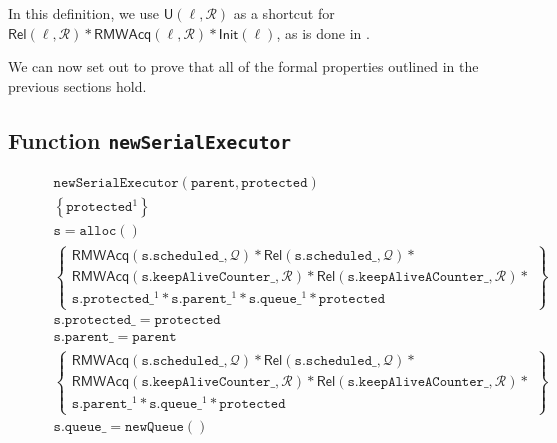 In this definition, we use $\mathsf{U}(\ell, \mathcal{R})$ as a shortcut for $\mathsf{Rel}(\ell, \mathcal{R}) * \mathsf{RMWAcq}(\ell, \mathcal{R}) * \mathsf{Init}(\ell)$, as is done in \cite{fsl}.

We can now set out to prove that all of the formal properties outlined in the previous sections hold.

\subsection{Function \texttt{newSerialExecutor}}

\begin{figure}
\begin{equation*}
\begin{array}{l}
	\mathtt{newSerialExecutor(parent, protected)} \\
	
	\left\{\mathtt{protected}^1 \right\}\\

	\mathtt{s = alloc()}\\
			\left\{
			\begin{array}{l}
				\mathsf{RMWAcq}(\mathtt{s.scheduled\_}, \mathcal{Q}) * \mathsf{Rel}(\mathtt{s.scheduled\_}, \mathcal{Q}) * \\ 
					\mathsf{RMWAcq}(\mathtt{s.keepAliveCounter\_}, \mathcal{R}) * \mathsf{Rel}(\mathtt{s.keepAliveACounter\_}, \mathcal{R}) * \\
					\mathtt{s.protected\_}^1 * \mathtt{s.parent\_}^1 * \mathtt{s.queue\_}^1 * \mathtt{protected}
			\end{array}
		\right\} \\

	\mathtt{s.protected\_ = protected} \\
	\mathtt{s.parent\_ = parent} \\

	\left\{
			\begin{array}{l}
				\mathsf{RMWAcq}(\mathtt{s.scheduled\_}, \mathcal{Q}) * \mathsf{Rel}(\mathtt{s.scheduled\_}, \mathcal{Q}) * \\ 
					\mathsf{RMWAcq}(\mathtt{s.keepAliveCounter\_}, \mathcal{R}) * \mathsf{Rel}(\mathtt{s.keepAliveACounter\_}, \mathcal{R}) * \\
					 \mathtt{s.parent\_}^1 * \mathtt{s.queue\_}^1 * \mathtt{protected}
			\end{array} \right\} \\

			\mathtt{s.queue\_ = new Queue()} \\


\end{array}
\end{equation*}
\end{figure}
